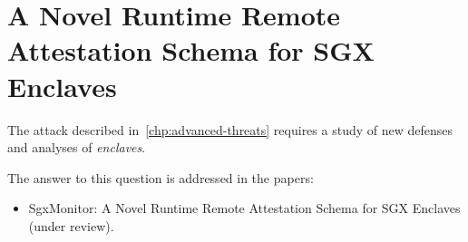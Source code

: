 \chapter{A Novel Runtime Remote Attestation Schema for SGX Enclaves} %
\label{chp:runtime-protection-trusted} 

The attack described in~\ref{chp:advanced-threats} requires a study of new
defenses and analyses of \emph{enclaves}.

The answer to this question is addressed in the papers:
\begin{itemize}
	\item SgxMonitor: A Novel Runtime Remote Attestation Schema for SGX 
	Enclaves (under review).
\end{itemize}